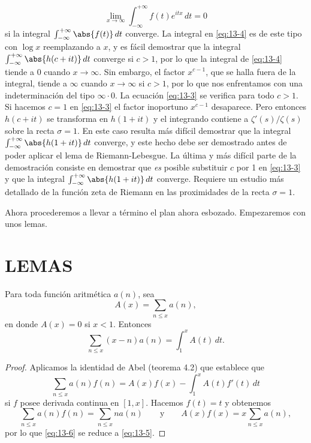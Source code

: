     \begin{equation*}
        \lim_{x\to\infty}\int_{-\infty}^{+\infty}f(t)e^{itx}\,dt=0
    \end{equation*}
    si la integral $\int_{-\infty}^{+\infty}\abs{f(t)}\,dt$ converge. La integral en
    \eqref{eq:13-4} es de este tipo con $\log x$ reemplazando a $x$, y es fácil demostrar que
    la integral $\int_{-\infty}^{+\infty}\abs{h(c+it)}\,dt$ converge si $c>1$, por lo que la
    integral de \eqref{eq:13-4} tiende a 0 cuando $x\to\infty$. Sin embargo, el factor
    $x^{c-1}$, que se halla fuera de la integral, tiende a $\infty$ cuando $x\to\infty$ si $c>1$,
    por lo que nos enfrentamos con una indeterminación del tipo $\infty\cdot0$. La ecuación
    \eqref{eq:13-3} se verifica para todo $c>1$. Si hacemos $c=1$ en \eqref{eq:13-3} el
    factor inoportuno $x^{c-1}$ desaparece. Pero entonces $h(c+it)$ se transforma en
    $h(1+it)$ y el integrando contiene a $\zeta'(s)/\zeta(s)$ sobre la recta $\sigma=1$. En
    este caso resulta más difícil demostrar que la integral
    $\int_{-\infty}^{+\infty}\abs{h(1+it)}\,dt$ converge, y este hecho debe ser demostrado
    antes de poder aplicar el lema de Riemann-Lebesgue. La última y más difícil parte de la
    demostración consiste en demostrar que \textit{es} posible substituir $c$ por 1 en
    \eqref{eq:13-3} y que la integral $\int_{-\infty}^{+\infty}\abs{h(1+it)}\,dt$ converge.
    Requiere un estudio más detallado de la función zeta de Riemann en las proximidades de la
    recta $\sigma=1$.

    Ahora procederemos a llevar a término el plan ahora esbozado. Empezaremos con unos lemas.

    \section{LEMAS}

    \begin{lema}\label{lem:13-1}
        Para toda función aritmética $a(n)$, sea
        \begin{equation*}
            A(x)=\sum_{n\leq x}a(n),
        \end{equation*}
        en donde $A(x)=0$ si $x<1$. Entonces
        \begin{equation}\label{eq:13-5}
            \sum_{n\leq x}(x-n)a(n)=\int_1^xA(t)\,dt.
        \end{equation}
    \end{lema}

    \begin{proof}
        Aplicamos la identidad de Abel (teorema 4.2) que establece que
        \begin{equation}\label{eq:13-6}
            \sum_{n\leq x}a(n)f(n)=A(x)f(x)-\int_1^xA(t)f'(t)\,dt
        \end{equation}
        si $f$ posee derivada continua en $[1,x]$. Hacemos $f(t)=t$ y obtenemos
        \begin{equation*}
            \sum_{n\leq x}a(n)f(n)=\sum_{n\leq x}na(n)\qquad\text{y}\qquad A(x)f(x)=x\sum_{n\leq x}a(n),
        \end{equation*}
        por lo que \eqref{eq:13-6} se reduce a \eqref{eq:13-5}.
    \end{proof}

